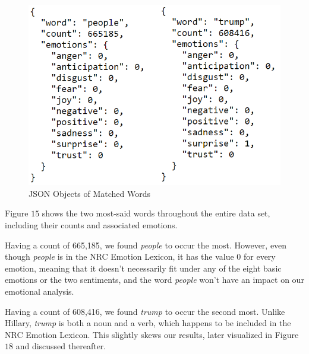 \documentclass[letterpaper]{article}
\begin{document}
\begin{figure}[!htb]
\begin{center}
\includegraphics[scale=0.9]{Images/topTwoWordsWithEmotion.png}
\caption{JSON Objects of Matched Words}
\label{fig1}
\end{center}
\end{figure}

Figure $15$ shows the two most-said words throughout the entire data set, including their counts and associated emotions.

Having a count of 665,185, we found \textit{people} to occur the most. However, even though \textit{people} is in the NRC Emotion Lexicon, it has the value $0$ for every emotion, meaning that it doesn't necessarily fit under any of the eight basic emotions or the two sentiments, and the word \textit{people} won't have an impact on our emotional analysis.

Having a count of 608,416, we found \textit{trump} to occur the second most. Unlike Hillary, \textit{trump} is both a noun and a verb, which happens to be included in the NRC Emotion Lexicon. This slightly skews our results, later visualized in Figure $18$ and discussed thereafter.
\end{document}
